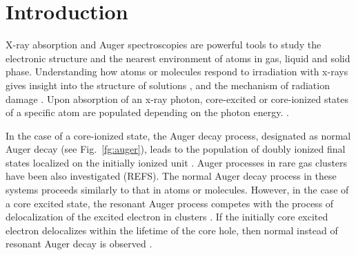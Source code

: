 \section{Introduction}


X-ray absorption and Auger spectroscopies are powerful tools to study the electronic structure and the nearest environment of atoms in gas, liquid and solid phase. Understanding how atoms or molecules respond to irradiation with x-rays gives insight into the structure of solutions \citep{Pokapanich09:7264}, and the mechanism of radiation damage \citep{ONeill02:329,Carugo05:213,Stumpf16:237}. Upon absorption of an x-ray photon, core-excited or core-ionized states of a specific atom are populated depending on the photon energy. .

In the case of a core-ionized state, the Auger decay process, designated as normal Auger decay (see Fig.\ \ref{fg:auger}), leads to the population of doubly ionized final states localized on the initially ionized unit \citep{stoychev08:074307,Demekhin08:043421,Demekhin09:104303,Ouchi11:053415}. Auger processes in rare gas clusters have been also investigated \citep{Wurth93:6697} (REFS). The normal Auger decay process in these systems proceeds similarly to that in atoms or molecules. However, in the case of a core excited state, the resonant Auger process competes with the process of delocalization of the excited electron in clusters \citep{Bjorneholm95:3017}. If the initially core excited electron delocalizes within the lifetime of the core hole, then normal instead of resonant Auger decay is observed \citep{Bjorneholm95:3017}. 


